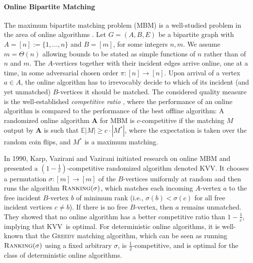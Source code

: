 \documentclass[a4paper]{article}
\newcommand{\Rank}{\textsc{Ranking}}
\newcommand{\KVV}{\textsc{KVV}}
\begin{document}
\paragraph*{Online Bipartite Matching}
The maximum bipartite matching problem (\textsc{MBM}) is a well-studied problem in the area of online
algorithms \cite{kvv90,bm08,djk13}. Let $G = (A, B, E)$ be a bipartite graph with
$A = [n]  := \{1, \dots, n \}$ and $B = [m]$, for some integers $n,m$. We
assume $m = \Theta(n)$ allowing bounds to be stated as simple functions of $n$ rather than of $n$ and $m$.
The $A$-vertices together with their incident edges
arrive online, one at a time, in
some adversarial chosen order $\pi: [n] \rightarrow [n]$. Upon arrival of a vertex $a \in A$,
the online algorithm has to irrevocably decide to which of its incident (and yet unmatched) $B$-vertices
it should be matched.
The considered quality measure is the well-established {\em competitive ratio}
\cite{st85}, where
the performance of an online algorithm is compared to the performance of the best
offline algorithm: A randomized online algorithm $\textbf{A}$ for \textsc{MBM}
is $c$-competitive if the matching $M$ output by $\textbf{A}$ is such that
$\mathbb{E} |M| \ge c \cdot |M^*|$, where the expectation is taken over the random coin flips,
and $M^*$ is a maximum matching.

In 1990, Karp, Vazirani and Vazirani \cite{kvv90} initiated research on
online \textsc{MBM} and presented a $(1-\frac{1}{e})$-competitive randomized algorithm denoted \KVV. It chooses
a permutation $\sigma: [m] \rightarrow [m]$ of the $B$-vertices uniformly at random and then runs
the algorithm $\Rank(\sigma)$,
which matches each incoming $A$-vertex $a$ to the free incident $B$-vertex $b$ of minimum rank
(i.e., $\sigma(b) < \sigma(c)$ for all free incident vertices $c \neq b$).
If there is no free $B$-vertex, then $a$ remains unmatched.
They showed that no online algorithm has a better competitive ratio than $1-\frac{1}{e}$, implying
that \KVV~is optimal.
For deterministic online algorithms, it is well-known that the \textsc{Greedy} matching algorithm,
which can be seen as running $\Rank(\sigma)$ using a fixed arbitrary $\sigma$, is $\frac{1}{2}$-competitive,
and is optimal for the class of deterministic online algorithms.
\end{document}
